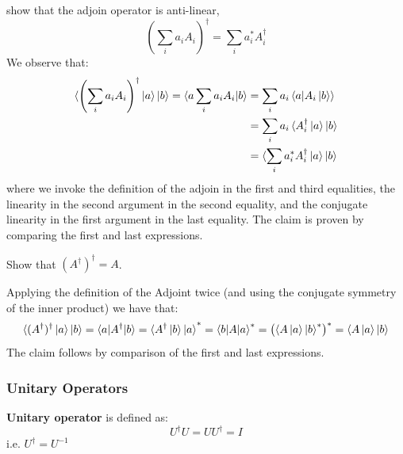 \begin{example}
    show that the adjoin operator is anti-linear,
    \[
    \left(\sum_i a_iA_i \right)^{\dagger} = \sum_i a_i^* A_i^{\dagger}
    \]
    We observe that:
    \begin{align*}
        \braket{\left(\sum_i a_iA_i\right)^{\dagger}\ket{a}|b}=\braket{a\sum_ia_iA_i|b}&=\sum_i a_i \braket{a|A_i\ket{b}}\\
        &=\sum_i a_i\braket{A_i^{\dagger}\ket{a}|b}\\
        &=\braket{\sum_i a_i^*A_i^{\dagger}\ket{a}|b}
    \end{align*}
    where we invoke the definition of the adjoin in the first and third equalities, the linearity in the second argument in the second equality, and the conjugate linearity in the first argument in the last equality. The claim is proven by comparing the first and last expressions.
\end{example}

\begin{example}
    Show that $(A^{\dagger})^{\dagger}=A$.

    Applying the definition of the Adjoint twice (and using the conjugate symmetry of the inner product) we have that:
    \[
\braket{(A^{\dagger})^{\dagger}\ket{a}|b}=\braket{a|A^{\dagger}|b}=\braket{A^{\dagger}\ket{b}|a}^*=\braket{b|A|a}^*=\left(\braket{A\ket{a}|b}^*\right)^*=\braket{A\ket{a}|b}
    \]
    The claim follows by comparison of the first and last expressions.
\end{example}

\subsubsection{Unitary Operators}\label{subsubsec:Unitary Operators}
\begin{definition}
\textbf{Unitary operator} is defined as:
\[U^{\dagger}U=UU^{\dagger}=I\]
i.e. $U^{\dagger}=U^{-1}$\\
\end{definition}

